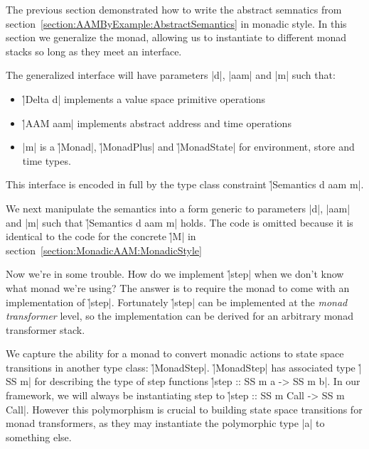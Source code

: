 The previous section demonstrated how to write the abstract semnatics from
section~\ref{section:AAMByExample:AbstractSemantics} in monadic style.
%
In this section we generalize the monad, allowing us to instantiate to
different monad stacks so long as they meet an interface.


The generalized interface will have parameters \p|d|, \p|aam| and \p|m| such
that:
%
\begin{itemize}
\item \h|Delta d| implements a value space primitive operations
\item \h|AAM aam| implements abstract address and time operations
\item \p|m| is a \h|Monad|, \h|MonadPlus| and \h|MonadState| for environment,
      store and time types.
\end{itemize}
%
This interface is encoded in full by the type class constraint 
\h|Semantics d aam m|.
%


We next manipulate the semantics into a form generic to parameters \p|d|,
\p|aam| and \p|m| such that \h|Semantics d aam m| holds.
%
%
%
The code is omitted because it is identical to the code for the concrete \h|M|
in section~\ref{section:MonadicAAM:MonadicStyle}


Now we're in some trouble.
%
How do we implement \h|step| when we don't know what monad we're using?
%
The answer is to require the monad to come with an implementation of \h|step|.
%
Fortunately \h|step| can be implemented at the \textit{monad transformer}
level, so the implementation can be derived for an arbitrary monad transformer
stack.


We capture the ability for a monad to convert monadic actions to state space
transitions in another type class: \h|MonadStep|.
%
%
\h|MonadStep| has associated type \h|SS m| for describing the type of step
functions \h|step :: SS m a -> SS m b|.
%
In our framework, we will always be instantiating step to 
\h|step :: SS m Call -> SS m Call|.
%
However this polymorphism is crucial to building state space transitions for
monad transformers, as they may instantiate the polymorphic type \p|a| to
something else.

